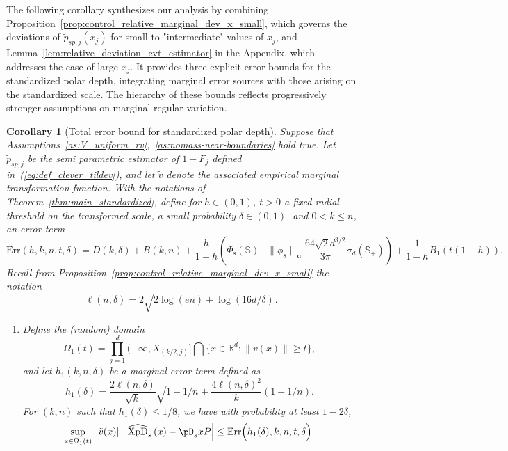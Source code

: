 \documentclass{article}
\numberwithin{equation}{section}
\newtheorem{corollary}{Corollary}[section]
\newcommand{\rset}{\mathbb{R}}
\newcommand{\sphere}{\mathbb{S}}
\newcommand{\XpDsymbol}{\mathrm{XpD}}  %
\newcommand{\coDs}[2]{\pD_s{#1}{#2}}
\newcommand{\hatcoDs}[1]{\widehat{\XpDsymbol}_s\left({#1}\right)}
\newcommand{\Phitrad}{\Phi_{\mathrm{s}}} %
\begin{document}
The following corollary synthesizes our analysis by combining Proposition~\ref{prop:control_relative_marginal_dev_x_small}, which governs the deviations of $\tilde{p}_{sp,j}(x_j)$ for small to "intermediate" values of $x_j$, and Lemma~\ref{lem:relative_deviation_evt_estimator} in the Appendix, which addresses the case of large $x_j$. It provides three explicit error bounds for the standardized polar depth, integrating marginal error sources with those arising on the standardized scale. The hierarchy of these bounds reflects progressively stronger assumptions on marginal regular variation.
 \begin{corollary}[Total error bound for standardized polar depth]\label{cor:total_error_standardized}
   Suppose that Assumptions~\ref{as:V_uniform_rv},~\ref{as:nomass-near-boundaries} hold true. Let $\tilde p_{sp,j}$ be the semi parametric estimator of $1- F_j$ defined in~(\ref{eq:def_clever_tildev}), and let $\tilde v$ denote the associated empirical marginal transformation function.
   With the notations of Theorem~\ref{thm:main_standardized}, define for $h\in(0,1)$, $t>0$ a fixed radial threshold on the transformed scale, a small probability $\delta\in(0,1)$, and $0<k\le n$, an error term 
   $$
   \mathrm{Err}(h,k,n,t,\delta) =  D(k,\delta) +  B(k,n) + \frac{h}{1-h}(\Phitrad(\sphere)+ \|\phi_s\|_\infty\frac{64\sqrt{2} d^{3/2}}{3\pi}\sigma_{d}(\sphere_+))
    + \frac{1}{1 - h} B_1(t(1-h)). 
$$
Recall from Proposition~\ref{prop:control_relative_marginal_dev_x_small} the notation
   $$
   \ell(n,\delta) = 2 \sqrt{ 2 \log(en) + \log(16d/\delta)  }. 
   $$
\begin{enumerate}
\item Define the (random) domain
  $$
  \Omega_1(t) =  \prod_{j=1}^d (-\infty, X_{(k/2,j)}] \bigcap \{x\in\rset^d: \| \tilde v(x)\| \ge t \}, 
  $$
  and let  $h_1(k,n,\delta)$ be a marginal error term defined as 
  $$
  h_1(\delta) = \frac{2 \ell(n,\delta)}{\sqrt{k}} \sqrt{1 +1/n} + \frac{4 \ell(n,\delta)^2}{k} (1 +1/n) .
  $$
   For  $(k,n)$  such  that
$h_1(\delta)\le 1/8$, 
we have    with probability at least $1 - 2\delta $,
  $$
  \sup_{ x \in \Omega_1(t)}  \|\tilde v(x)\|~\Big| \hatcoDs{x} - \coDs{x}{P} \Big| \le \mathrm{Err}\Big(h_1(\delta), k, n, t, \delta \Big).  
  $$


\end{enumerate}
\end{corollary}
\end{document}
